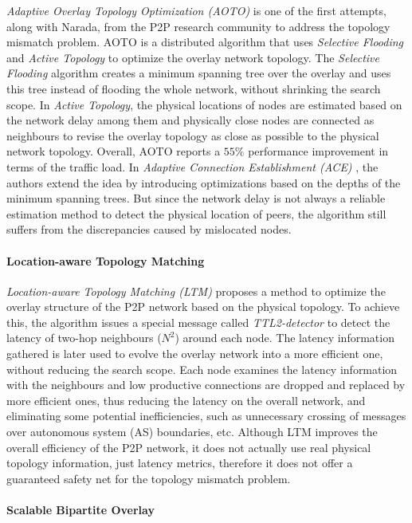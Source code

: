 \documentclass[acmcsur,acmnow]{acmtrans2m}
\begin{document}
\emph{Adaptive Overlay Topology Optimization (AOTO)} \cite{liu_auto_2003} is one of the first attempts, along with Narada, from the P2P research community to address the topology mismatch problem. AOTO is a distributed algorithm that uses \emph{Selective Flooding} and \emph{Active Topology} to optimize the overlay network topology. The \emph{Selective Flooding} algorithm creates a minimum spanning tree over the overlay and uses this tree instead of flooding the whole network, without shrinking the search scope. In \emph{Active Topology}, the physical locations of nodes are estimated based on the network delay among them and physically close nodes are connected as neighbours to revise the overlay topology as close as possible to the physical network topology. Overall, AOTO reports a $55\%$ performance improvement in terms of the traffic load. In \emph{Adaptive Connection Establishment (ACE)} \cite{liu_ace_2004}, the authors extend the idea by introducing optimizations based on the depths of the minimum spanning trees. But since the network delay is not always a reliable estimation method to detect the physical location of peers, the algorithm still suffers from the discrepancies caused by mislocated nodes.

\paragraph*{\bf Location-aware Topology Matching}

\emph{Location-aware Topology Matching (LTM)} \cite{liu_ltm_2004} proposes a method to optimize the overlay structure of the P2P network based on the physical topology. To achieve this, the algorithm issues a special message called \textit{TTL2-detector} to detect the latency of two-hop neighbours ($N^2$) around each node. The latency information gathered is later used to evolve the overlay network into a more efficient one, without reducing the search scope. Each node examines the latency information with the neighbours and low productive connections are dropped and replaced by more efficient ones, thus reducing the latency on the overall network, and eliminating some potential inefficiencies, such as unnecessary crossing of messages over autonomous system (AS) boundaries, etc. Although LTM improves the overall efficiency of the P2P network, it does not actually use real physical topology information, just latency metrics, therefore it does not offer a guaranteed safety net for the topology mismatch problem.

\paragraph*{\bf Scalable Bipartite Overlay}
\end{document}

